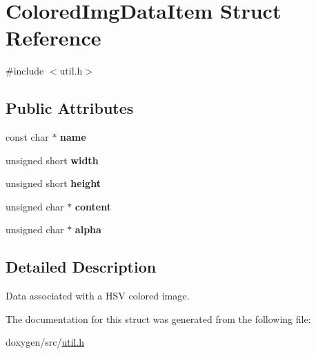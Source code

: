 \hypertarget{struct_colored_img_data_item}{}\section{Colored\+Img\+Data\+Item Struct Reference}
\label{struct_colored_img_data_item}


{\ttfamily \#include $<$util.\+h$>$}

\subsection*{Public Attributes}
\begin{DoxyCompactItemize}
\item 
\mbox{\label{struct_colored_img_data_item_afed2ef0f30516caf6b81a9d41033c8f3}} 
const char $\ast$ {\bfseries name}
\item 
\mbox{\label{struct_colored_img_data_item_aebc8ef167c7bbdf928fcc59b3c9d436b}} 
unsigned short {\bfseries width}
\item 
\mbox{\label{struct_colored_img_data_item_acfac94346e3f7837df12c487bce866f2}} 
unsigned short {\bfseries height}
\item 
\mbox{\label{struct_colored_img_data_item_a0f81eed6cfa6792cfa3d6bf9d4e40faa}} 
unsigned char $\ast$ {\bfseries content}
\item 
\mbox{\label{struct_colored_img_data_item_ac40939426f6021e7da5677cc10160996}} 
unsigned char $\ast$ {\bfseries alpha}
\end{DoxyCompactItemize}


\subsection{Detailed Description}
Data associated with a H\+SV colored image. 

The documentation for this struct was generated from the following file\+:\begin{DoxyCompactItemize}
\item 
doxygen/src/\mbox{\hyperlink{util_8h}{util.\+h}}\end{DoxyCompactItemize}
